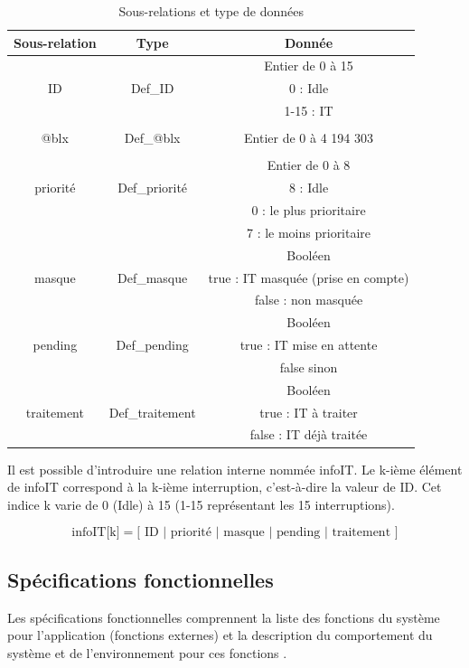 \begin{table}[H]
	\centering
	\begin{tabular}{|c|c|c|}
		\hline
		Sous-relation & Type & Donnée \\
		\hline
		& & Entier de 0 à 15\\
		ID & Def\_ID & 0 : Idle\\
		& & 1-15 : IT\\
		\hline
		& & \\
		@blx & Def\_@blx & Entier de 0 à 4 194 303\\
		& & \\
		\hline
		& & Entier de 0 à 8\\
		priorité & Def\_priorité & 8 : Idle\\
		& & 0 : le plus prioritaire\\
		& & 7 : le moins prioritaire\\
		\hline
		& & Booléen\\
		masque & Def\_masque & true : IT masquée (prise en compte)\\
		& & false : non masquée\\
		\hline
		& & Booléen\\
		pending & Def\_pending & true : IT mise en attente\\
		& & false sinon\\
		\hline
		& & Booléen\\
		traitement & Def\_traitement & true : IT à traiter\\
		& & false : IT déjà traitée\\
		\hline
	\end{tabular}
	\caption{Sous-relations et type de données}
	\label{tab:sous-relation}
\end{table}

Il est possible d'introduire une relation interne nommée infoIT. Le k-ième élément de infoIT correspond à la k-ième interruption, c'est-à-dire la valeur de ID. Cet indice k varie de 0 (Idle) à 15 (1-15 représentant les 15 interruptions).

\begin{equation*}
	\mbox{infoIT[k]} = \big[ \mbox{ ID } | \mbox{ priorité } | \mbox{ masque } | \mbox{ pending } | \mbox{ traitement }\big]
\end{equation*}

\newpage

\subsection{Spécifications fonctionnelles}
Les spécifications fonctionnelles comprennent la liste des fonctions du système
pour l'application (fonctions externes) et la description du comportement du système et
de l'environnement pour ces fonctions \cite{Calvez_2}.

